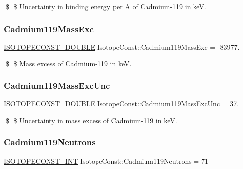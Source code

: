 \$ \$ Uncertainty in binding energy per A of Cadmium-\/119 in keV. \mbox{\label{group___isotope_const-_cadmium-_cd119_ga26090f8ef5e91f4e7bb318a88b53f607}} 
\subsubsection{\texorpdfstring{Cadmium119\+Mass\+Exc}{Cadmium119MassExc}}
{\footnotesize\ttfamily \mbox{\hyperlink{group___isotope_const-_macros_ga8f45a7272ce02c0b4c65c44636ed719a}{I\+S\+O\+T\+O\+P\+E\+C\+O\+N\+S\+T\+\_\+\+D\+O\+U\+B\+LE}} Isotope\+Const\+::\+Cadmium119\+Mass\+Exc = -\/83977.}

\$ \$ Mass excess of Cadmium-\/119 in keV. \mbox{\label{group___isotope_const-_cadmium-_cd119_gaae832edf6a1d9361d4388a72e2a73b58}} 
\subsubsection{\texorpdfstring{Cadmium119\+Mass\+Exc\+Unc}{Cadmium119MassExcUnc}}
{\footnotesize\ttfamily \mbox{\hyperlink{group___isotope_const-_macros_ga8f45a7272ce02c0b4c65c44636ed719a}{I\+S\+O\+T\+O\+P\+E\+C\+O\+N\+S\+T\+\_\+\+D\+O\+U\+B\+LE}} Isotope\+Const\+::\+Cadmium119\+Mass\+Exc\+Unc = 37.}

\$ \$ Uncertainty in mass excess of Cadmium-\/119 in keV. \mbox{\label{group___isotope_const-_cadmium-_cd119_gae465c6938e59234f8ffcaf78be6d7d0c}} 
\subsubsection{\texorpdfstring{Cadmium119\+Neutrons}{Cadmium119Neutrons}}
{\footnotesize\ttfamily \mbox{\hyperlink{group___isotope_const-_macros_ga5f18360b3e99483a35c32d789e62621c}{I\+S\+O\+T\+O\+P\+E\+C\+O\+N\+S\+T\+\_\+\+I\+NT}} Isotope\+Const\+::\+Cadmium119\+Neutrons = 71}

